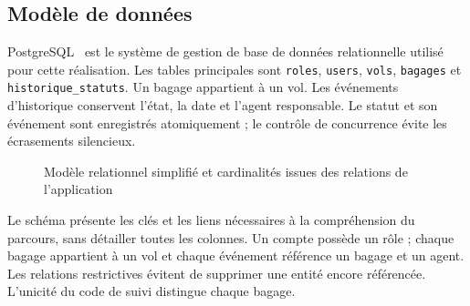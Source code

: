 \documentclass[11pt]{extarticle}
\begin{document}
\subsection{Modèle de données}
PostgreSQL~\cite{postgresql} est le système de gestion de base de données relationnelle utilisé pour cette réalisation. Les tables principales sont \texttt{roles}, \texttt{users}, \texttt{vols}, \texttt{bagages} et \texttt{historique\_statuts}. Un bagage appartient à un vol. Les événements d'historique conservent l'état, la date et l'agent responsable. Le statut et son événement sont enregistrés atomiquement ; le contrôle de concurrence évite les écrasements silencieux.
\begin{figure}[H]\centering
{}
\caption{Modèle relationnel simplifié et cardinalités issues des relations de l'application}
\label{fig:modele-relationnel}
\end{figure}
Le schéma présente les clés et les liens nécessaires à la compréhension du parcours, sans détailler toutes les colonnes. Un compte possède un rôle ; chaque bagage appartient à un vol et chaque événement référence un bagage et un agent. Les relations restrictives évitent de supprimer une entité encore référencée. L'unicité du code de suivi distingue chaque bagage.
\end{document}
